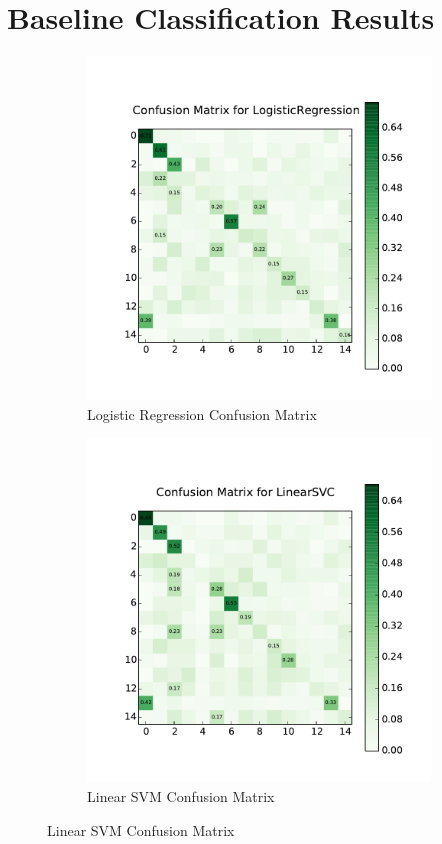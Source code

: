 \section{Baseline Classification Results}
\begin{figure}[ht]
	\begin{subfigure}{.5\textwidth}
	\centering
	\includegraphics[width=.8\linewidth]{images/baseline/cm_log_reg.pdf}
	\caption{Logistic Regression Confusion Matrix}
	\end{subfigure}
	
	\begin{subfigure}{.5\textwidth}
	\includegraphics[width=.8\linewidth]{images/baseline/cm_linear_svm.pdf}
	\caption{Linear SVM Confusion Matrix}
	\end{subfigure}
	

\end{figure}
